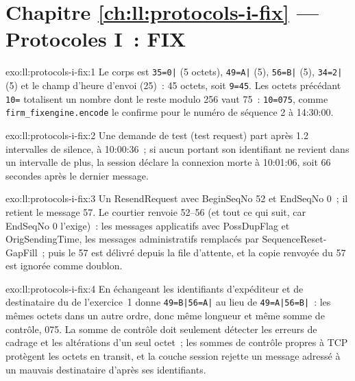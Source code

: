\section*{Chapitre \ref{ch:ll:protocols-i-fix} --- Protocoles I~: FIX}

\begin{solution}{exo:ll:protocols-i-fix:1}
Le corps est \texttt{35=0|} (5 octets), \texttt{49=A|} (5), \texttt{56=B|} (5), \texttt{34=2|} (5) et le champ d'heure d'envoi (25)~:
45 octets, soit \texttt{9=45}. Les octets précédant \texttt{10=} totalisent un nombre dont le reste modulo 256 vaut 75~: \texttt{10=075}, comme
\texttt{firm\_fixengine.encode} le confirme pour le numéro de séquence 2 à 14:30:00.
\end{solution}

\begin{solution}{exo:ll:protocols-i-fix:2}
Une demande de test (test request) part après 1.2 intervalles de silence, à 10:00:36~; si aucun  portant son identifiant ne revient dans un intervalle de plus,
la session déclare la connexion morte à 10:01:06, soit 66 secondes après le dernier message.
\end{solution}

\begin{solution}{exo:ll:protocols-i-fix:3}
Un ResendRequest avec BeginSeqNo 52 et EndSeqNo 0~; il retient le message 57. Le courtier renvoie 52--56 (et tout ce qui suit, car
EndSeqNo 0 l'exige)~: les messages applicatifs avec PossDupFlag et OrigSendingTime, les messages administratifs remplacés par
SequenceReset-GapFill~; puis le 57 est délivré depuis la file d'attente, et la copie renvoyée du 57 est ignorée comme doublon.
\end{solution}

\begin{solution}{exo:ll:protocols-i-fix:4}
En échangeant les identifiants d'expéditeur et de destinataire du  de l'exercice~1 donne \texttt{49=B|56=A|} au lieu de
\texttt{49=A|56=B|}~: les mêmes octets dans un autre ordre, donc même longueur et même somme de contrôle, 075. La somme de contrôle doit seulement
détecter les erreurs de cadrage et les altérations d'un seul octet~; les sommes de contrôle propres à TCP protègent les octets en transit, et la couche session rejette
un message adressé à un mauvais destinataire d'après ses identifiants.
\end{solution}

